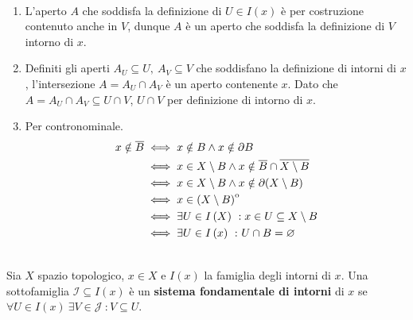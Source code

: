 \begin{demonstration}~{}
\begin{enumerate}[label=\Roman*]
\item L'aperto $A$ che soddisfa la definizione di $U\in I\left(x\right)$ è per costruzione contenuto anche in $V$, dunque $A$ è un aperto che soddisfa la definizione di $V$ intorno di $x$.
\item Definiti gli aperti $A_U\subseteq U,\ A_V\subseteq V$ che soddisfano la definizione di intorni di $x$, l'intersezione $A=A_U\cap A_V$ è un aperto contenente $x$. Dato che $A=A_U\cap A_V\subseteq U\cap V$, $U\cap V$ per definizione di intorno di $x$.
\item Per contronominale. \begin{align*}
	x\notin \overline{B} &\iff x\notin B \wedge x\notin \partial B\\
	&\iff x\in X\setminus B \wedge x\notin \overline{B}\cap\overline{X\setminus B}\\
	& \iff x\in X\setminus B \wedge x\notin \partial (X\setminus B)\\
	& \iff x\in {\kern0pt\left(X\setminus B\right)}^{\mathrm{o}}\\
	& \iff \exists U\in I\left(X\right)\ : x\in U\subseteq X\setminus B\\
	&\iff \exists U\in I\left(x\right)\ \colon U\cap B=\varnothing
\end{align*} 
\end{enumerate}
\vspace{-6mm}
\end{demonstration}
\begin{define}~{}\\
Sia $X$ spazio topologico, $x\in X$ e $I\left(x\right)$ la famiglia degli intorni di $x$. Una sottofamiglia $\mathcal{I}\subseteq I\left(x\right)$ è un \textbf{sistema fondamentale di intorni} di $x$ se $\forall U\in I\left(x\right)\ \exists V\in\mathcal{J}\ \colon V\subseteq U$.
\end{define}
